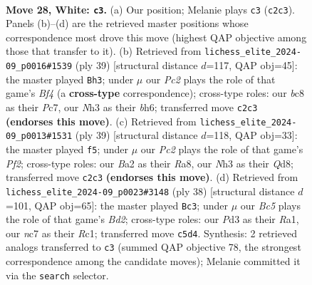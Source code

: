 \documentclass[11pt]{article}
\begin{document}
\begin{figure}[p]
\label{fig:thought-m52}
\end{figure}

\clearpage

\begin{figure}[p]\centering
\begin{subfigure}{0.46\textwidth}\centering
\resizebox{\linewidth}{!}{%
\newchessgame
\chessboard[
  setfen={2bq3r/2n2pk1/p2b2p1/n1B1p2p/P3P3/N2PQ2N/BrP1RPPP/R4K2 w - - 8 28},
  showmover=false,
  pgfstyle=straightmove, color=movearrow, markmove={c2-c3}
]}
\caption{}
\end{subfigure}\hfill
\begin{subfigure}{0.46\textwidth}\centering
\resizebox{\linewidth}{!}{%
\newchessgame
\chessboard[
  setfen={r5k1/1ppq1r1p/3p2pB/p1nPbb2/2PN4/6P1/PP1Q2BP/4RR1K b - - 3 20},
  showmover=false,
  pgfstyle=straightmove, color=movearrow, markmove={f5-h3}
]}
\caption{}
\end{subfigure}
\\[4pt]
\begin{subfigure}{0.46\textwidth}\centering
\resizebox{\linewidth}{!}{%
\newchessgame
\chessboard[
  setfen={r2q1rk1/5ppp/2p1p3/pb1n4/1b1PN3/pP2PQ2/B2B1PPP/R1R3K1 b - - 1 20},
  showmover=false,
  pgfstyle=straightmove, color=movearrow, markmove={f7-f5}
]}
\caption{}
\end{subfigure}\hfill
\begin{subfigure}{0.46\textwidth}\centering
\resizebox{\linewidth}{!}{%
\newchessgame
\chessboard[
  setfen={b4rk1/2p3pp/2n1pb2/p2q1p2/3P4/P2Q1NP1/1r1BPPBP/R1R3K1 w - - 0 20},
  showmover=false,
  pgfstyle=straightmove, color=movearrow, markmove={d2-c3}
]}
\caption{}
\end{subfigure}
\caption{\textbf{Move 28, White: \texttt{c3}.} (a) Our position; Melanie plays \texttt{c3} (\texttt{c2c3}). Panels (b)--(d) are the retrieved master positions whose correspondence most drove this move (highest QAP objective among those that transfer to it). (b) Retrieved from \texttt{lichess\_elite\_2024-09\_p0016\#1539} (ply 39) [structural distance $d$=117, QAP obj=45]: the master played \texttt{Bh3}; under $\mu$ our \emph{Pc2} plays the role of that game's \emph{Bf4} (a \textbf{cross-type} correspondence); cross-type roles: our \emph{b}c8 as their \emph{P}c7, our \emph{N}h3 as their \emph{b}h6; transferred move \texttt{c2c3} \textbf{(endorses this move)}. (c) Retrieved from \texttt{lichess\_elite\_2024-09\_p0013\#1531} (ply 39) [structural distance $d$=118, QAP obj=33]: the master played \texttt{f5}; under $\mu$ our \emph{Pc2} plays the role of that game's \emph{Pf2}; cross-type roles: our \emph{B}a2 as their \emph{R}a8, our \emph{N}h3 as their \emph{Q}d8; transferred move \texttt{c2c3} \textbf{(endorses this move)}. (d) Retrieved from \texttt{lichess\_elite\_2024-09\_p0023\#3148} (ply 38) [structural distance $d$=101, QAP obj=65]: the master played \texttt{Bc3}; under $\mu$ our \emph{Bc5} plays the role of that game's \emph{Bd2}; cross-type roles: our \emph{P}d3 as their \emph{R}a1, our \emph{n}c7 as their \emph{R}c1; transferred move \texttt{c5d4}. Synthesis: 2 retrieved analogs transferred to \texttt{c3} (summed QAP objective 78, the strongest correspondence among the candidate moves); Melanie committed it via the \texttt{search} selector.}

\end{figure}
\end{document}
